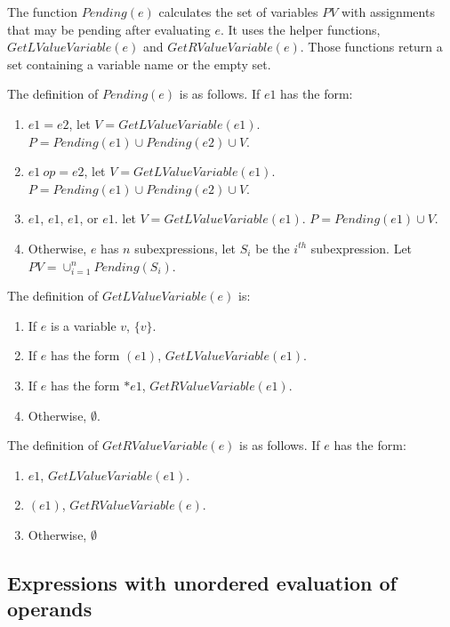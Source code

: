 The function $Pending(e)$ calculates the set of variables $PV$
with assignments that may be pending after evaluating $e$.  It uses
the helper functions,
$GetLValueVariable(e)$ and $GetRValueVariable(e)$.  Those functions
return a set containing a variable name or the empty set.

The definition of $Pending(e)$ is as follows. If $e1$ has the form:
\begin{enumerate}
\item $e1 = e2$, let $V = GetLValueVariable(e1)$.
$P = Pending(e1) \cup Pending(e2) \cup V$.
\item$e1~op= e2$, let $V = GetLValueVariable(e1)$.
$P = Pending(e1) \cup Pending(e2) \cup V$.
\item \code{++}$e1$, \code{--}$e1$, $e1$\code{++}, or $e1$\code{--}.
let $V =  GetLValueVariable(e1)$.  $P = Pending(e1) \cup V$.
\item Otherwise, $e$ has $n$ subexpressions, let $S_i$ be
the $i^{th}$ subexpression.  Let $PV = \cup_{i=1}^{n} Pending(S_i)$.
\end{enumerate}

The definition of $GetLValueVariable(e)$ is:
\begin{enumerate}
\item If $e$ is a variable $v$, $\{ v \}$.
\item If $e$ has the form $(e1)$, $GetLValueVariable(e1)$.
\item If $e$ has the form $*e1$, $GetRValueVariable(e1)$.
\item Otherwise, $\emptyset$.
\end{enumerate}

The definition of $GetRValueVariable(e)$ is as follows. If $e$ has the form:
\begin{enumerate}
\item \code{&}$e1$, $GetLValueVariable(e1)$.
\item$(e1)$, $GetRValueVariable(e)$.
\item Otherwise, $\emptyset$
\end{enumerate}

\subsection{Expressions with unordered evaluation of operands}

